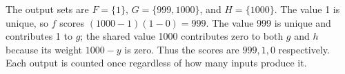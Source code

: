 The output sets are $F=\{1\}$, $G=\{999,1000\}$, and $H=\{1000\}$. The value 1 is unique, so $f$ scores $(1000-1)(1-0)=999$. The value 999 is unique and contributes 1 to $g$; the shared value 1000 contributes zero to both $g$ and $h$ because its weight $1000-y$ is zero. Thus the scores are $\boxed{999,1,0}$ respectively. Each output is counted once regardless of how many inputs produce it.
